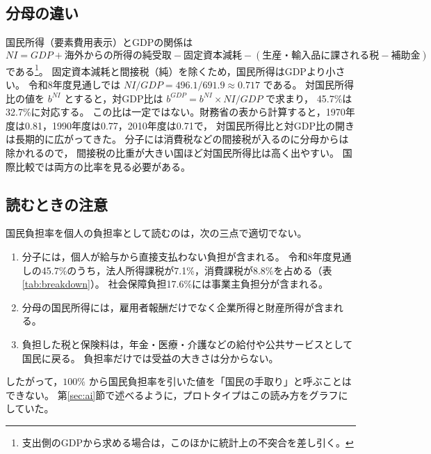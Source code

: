 \documentclass[paper=a4,fontsize=10pt]{jlreq}
\begin{document}
\subsection{分母の違い}

国民所得（要素費用表示）とGDPの関係は
\begin{equation}
  \mathit{NI} = \mathit{GDP} + \text{海外からの所得の純受取} - \text{固定資本減耗}
     - (\text{生産・輸入品に課される税} - \text{補助金})
\end{equation}
である\footnote{支出側のGDPから求める場合は，このほかに統計上の不突合を差し引く。}。
固定資本減耗と間接税（純）を除くため，国民所得はGDPより小さい。
令和8年度見通しでは $\mathit{NI}/\mathit{GDP}=496.1/691.9\approx 0.717$ である。
対国民所得比の値を $b^{\mathit{NI}}$ とすると，対GDP比は
$b^{\mathit{GDP}} = b^{\mathit{NI}}\times \mathit{NI}/\mathit{GDP}$ で求まり，
45.7\%は32.7\%に対応する。
この比は一定ではない。財務省の表から計算すると，1970年度は0.81，1990年度は0.77，2010年度は0.71で，
対国民所得比と対GDP比の開きは長期的に広がってきた。
分子には消費税などの間接税が入るのに分母からは除かれるので，
間接税の比重が大きい国ほど対国民所得比は高く出やすい。
国際比較では両方の比率を見る必要がある。

\subsection{読むときの注意}

国民負担率を個人の負担率として読むのは，次の三点で適切でない。
\begin{enumerate}
  \item 分子には，個人が給与から直接支払わない負担が含まれる。
    令和8年度見通しの45.7\%のうち，法人所得課税が7.1\%，消費課税が8.8\%を占める（表\ref{tab:breakdown}）。
    社会保障負担17.6\%には事業主負担分が含まれる。
  \item 分母の国民所得には，雇用者報酬だけでなく企業所得と財産所得が含まれる。
  \item 負担した税と保険料は，年金・医療・介護などの給付や公共サービスとして国民に戻る。
    負担率だけでは受益の大きさは分からない。
\end{enumerate}
したがって，$100\%$ から国民負担率を引いた値を「国民の手取り」と呼ぶことはできない。
第\ref{sec:ai}節で述べるように，プロトタイプはこの読み方をグラフにしていた。
\end{document}
